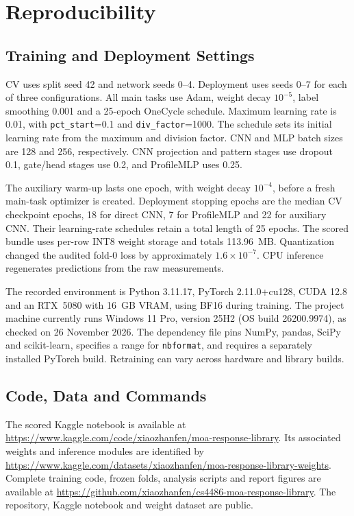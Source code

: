 \documentclass[journal]{IEEEtran}
\begin{document}
\section{Reproducibility}
\label{sec:reproducibility}

\subsection{Training and Deployment Settings}
CV uses split seed 42 and network seeds 0--4. Deployment uses seeds 0--7 for each of three configurations. All main tasks use Adam, weight decay $10^{-5}$, label smoothing 0.001 and a 25-epoch OneCycle schedule. Maximum learning rate is 0.01, with \texttt{pct\_start}=0.1 and \texttt{div\_factor}=1000. The schedule sets its initial learning rate from the maximum and division factor. CNN and MLP batch sizes are 128 and 256, respectively. CNN projection and pattern stages use dropout 0.1, gate/head stages use 0.2, and ProfileMLP uses 0.25.

The auxiliary warm-up lasts one epoch, with weight decay $10^{-4}$, before a fresh main-task optimizer is created. Deployment stopping epochs are the median CV checkpoint epochs, 18 for direct CNN, 7 for ProfileMLP and 22 for auxiliary CNN. Their learning-rate schedules retain a total length of 25 epochs. The scored bundle uses per-row INT8 weight storage and totals 113.96~MB. Quantization changed the audited fold-0 loss by approximately $1.6\times10^{-7}$. CPU inference regenerates predictions from the raw measurements.

The recorded environment is Python 3.11.17, PyTorch 2.11.0+cu128, CUDA 12.8 and an RTX~5080 with 16~GB VRAM, using BF16 during training. The project machine currently runs Windows 11 Pro, version 25H2 (OS build 26200.9974), as checked on 26 November 2026. The dependency file pins NumPy, pandas, SciPy and scikit-learn, specifies a range for \texttt{nbformat}, and requires a separately installed PyTorch build. Retraining can vary across hardware and library builds.

\subsection{Code, Data and Commands}
The scored Kaggle notebook is available at \url{https://www.kaggle.com/code/xiaozhanfen/moa-response-library}. Its associated weights and inference modules are identified by \url{https://www.kaggle.com/datasets/xiaozhanfen/moa-response-library-weights}. Complete training code, frozen folds, analysis scripts and report figures are available at \url{https://github.com/xiaozhanfen/cs4486-moa-response-library}. The repository, Kaggle notebook and weight dataset are public.
\end{document}
